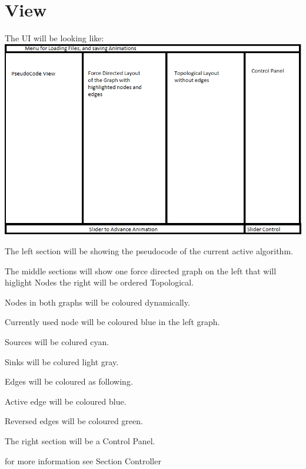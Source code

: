 \section{View}
The UI will be looking like: \\
\includegraphics[width=\textwidth]{parts/UIFinished}
\begin{list}{-}{}
\item The left section will be showing the pseudocode of the current active algorithm.
\item The middle sections will show one force directed  graph on the left that will higlight Nodes the right will be ordered Topological.

\item Nodes in both graphs will be coloured dynamically.
\begin{list}{-}{}
\item Currently used node will be coloured blue in the left graph.
\item Sources will be colured cyan.
\item Sinks will be colured light gray.
\end{list}
\item Edges will be coloured as following.
\begin{list}{-}{}
\item Active edge will be coloured blue.
\item Reversed edges will be coloured green.
\end{list}
\item The right section will be a Control Panel.
\begin{list}{-}{}
\item for more information see Section Controller

\end{list}
\end{list}




